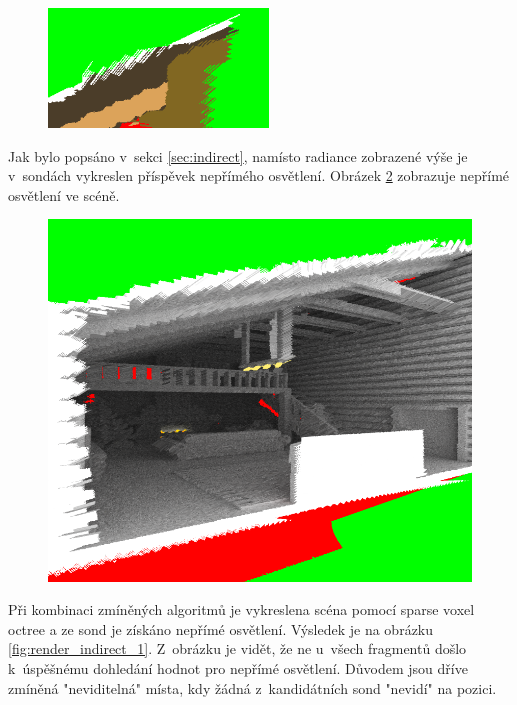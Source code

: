 \begin{figure}[H]
	\centering
	\captionsetup{justification=centering}
	\includegraphics[scale=2.5]{images/probes_inaccuracy.png}
	\label{fig:probes_inaccuracy}
\end{figure}

Jak bylo popsáno v~sekci \ref{sec:indirect}, namísto radiance zobrazené výše je v~sondách vykreslen příspěvek nepřímého osvětlení. Obrázek \ref{fig:probes_indirect_scene} zobrazuje nepřímé osvětlení ve scéně.

\begin{figure}[H]
	\centering
	\captionsetup{justification=centering}
	\includegraphics[scale=1]{images/probe_indirect_render.png}
	\label{fig:probes_indirect_scene}
\end{figure}

Při kombinaci zmíněných algoritmů je vykreslena scéna pomocí sparse voxel octree a ze sond je získáno nepřímé osvětlení. Výsledek je na obrázku \ref{fig:render_indirect_1}. Z~obrázku je vidět, že ne u~všech fragmentů došlo k~úspěšnému dohledání hodnot pro nepřímé osvětlení. Důvodem jsou dříve zmíněná "neviditelná" místa, kdy žádná z~kandidátních sond "nevidí" na pozici.

